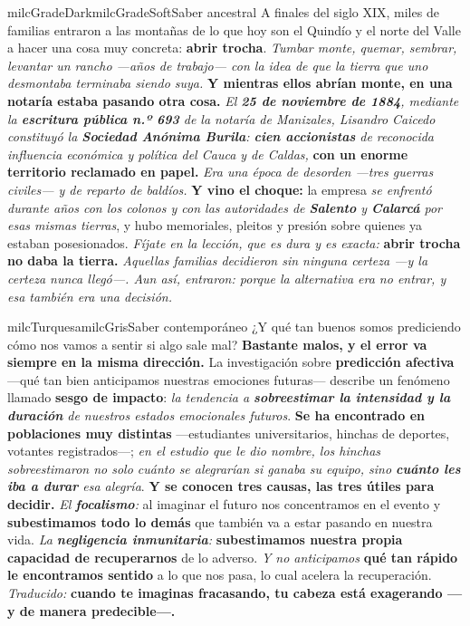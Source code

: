 \documentclass[11pt,letterpaper]{article}
\begin{document}
\begin{softbox}{milcGradeDark}{milcGradeSoft}{Saber ancestral}
A finales del siglo XIX, miles de familias entraron a las montañas de lo que hoy son el Quindío y el norte del Valle a hacer una cosa muy concreta: \textbf{abrir trocha}. \emph{Tumbar monte, quemar, sembrar, levantar un rancho ---años de trabajo--- con la idea de que la tierra que uno desmontaba terminaba siendo suya.} \textbf{Y mientras ellos abrían monte, en una notaría estaba pasando otra cosa.} \emph{El \textbf{25 de noviembre de 1884}, mediante la \textbf{escritura pública n.º 693} de la notaría de Manizales, Lisandro Caicedo constituyó la \textbf{Sociedad Anónima Burila}: \textbf{cien accionistas} de reconocida influencia económica y política del Cauca y de Caldas,} \textbf{con un enorme territorio reclamado en papel.} \emph{Era una época de desorden ---tres guerras civiles--- y de reparto de baldíos.} \textbf{Y vino el choque:} la empresa \emph{se enfrentó durante años con los colonos y con las autoridades de \textbf{Salento} y \textbf{Calarcá} por esas mismas tierras}, y hubo memoriales, pleitos y presión sobre quienes ya estaban posesionados. \emph{Fíjate en la lección, que es dura y es exacta:} \textbf{abrir trocha no daba la tierra.} \emph{Aquellas familias decidieron sin ninguna certeza ---y la certeza nunca llegó---. Aun así, entraron: porque la alternativa era no entrar, y esa también era una decisión.}
\end{softbox}

\begin{softbox}{milcTurquesa}{milcGris}{Saber contemporáneo}
¿Y qué tan buenos somos prediciendo cómo nos vamos a sentir si algo sale mal? \textbf{Bastante malos, y el error va siempre en la misma dirección.} La investigación sobre \textbf{predicción afectiva} ---qué tan bien anticipamos nuestras emociones futuras--- describe un fenómeno llamado \textbf{sesgo de impacto}: \emph{la tendencia a \textbf{sobreestimar la intensidad y la duración} de nuestros estados emocionales futuros}. \textbf{Se ha encontrado en poblaciones muy distintas} ---estudiantes universitarios, hinchas de deportes, votantes registrados---; \emph{en el estudio que le dio nombre, los hinchas sobreestimaron no solo cuánto se alegrarían si ganaba su equipo, sino \textbf{cuánto les iba a durar} esa alegría}. \textbf{Y se conocen tres causas, las tres útiles para decidir.} \emph{El \textbf{focalismo}:} al imaginar el futuro nos concentramos en el evento y \textbf{subestimamos todo lo demás} que también va a estar pasando en nuestra vida. \emph{La \textbf{negligencia inmunitaria}:} \textbf{subestimamos nuestra propia capacidad de recuperarnos} de lo adverso. \emph{Y no anticipamos} \textbf{qué tan rápido le encontramos sentido} a lo que nos pasa, lo cual acelera la recuperación. \emph{Traducido:} \textbf{cuando te imaginas fracasando, tu cabeza está exagerando ---y de manera predecible---.}
\end{softbox}
\end{document}
